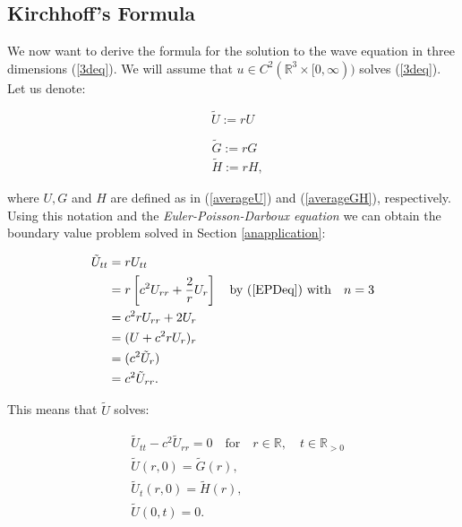 \documentclass[a4paper, 12pt]{article}
\numberwithin{equation}{section}
\begin{document}
\subsection{Kirchhoff's Formula}
We now want to derive the formula for the solution to the wave equation in three dimensions (\ref{3deq}). We will assume that $u \in C^2(\mathbb{R}^3 \times
[0, \infty))$ solves (\ref{3deq}). Let us denote:

\begin{equation} \label{Udash}
    \tilde{U}:=rU
\end{equation}

\begin{equation} \label{GHdash}
    \begin{aligned}
        &\tilde{G}:=rG\\
        &\tilde{H}:=rH,    
    \end{aligned}
\end{equation}

where $U,G$ and $H$ are defined as in (\ref{averageU}) and (\ref{averageGH}), respectively. 
\\

Using this notation and the \emph{Euler-Poisson-Darboux equation} we can
obtain the boundary value problem solved in Section \ref{anapplication}:

\begin{equation*}
    \begin{aligned}
        \tilde{U}_{tt}&=rU_{tt}\\
        &=r\left[c^2U_{rr}+\frac{2}{r}U_r\right] \quad \textrm{by (\ref{EPDeq}) with} \quad n=3\\
        &=c^2rU_{rr}+2U_r\\
        &=(U+c^2rU_r)_r\\
        &=(c^2\tilde{U}_r)\\
        &=c^2\tilde{U}_{rr}.        
    \end{aligned}
\end{equation*}

This means that $\tilde{U}$ solves:

\begin{equation} \label{tilUwave}
    \begin{aligned}
        &\tilde{U}_{tt}-c^2\tilde{U}_{rr}=0 \quad \textrm {for} \quad r \in \mathbb{R}, \quad t \in \mathbb{R}_{>0}\\
        &\tilde{U}(r, 0)=\tilde{G}(r), \\
        &\tilde{U}_t(r, 0)=\tilde{H}(r),\\
        &\tilde{U}(0, t)=0.
    \end{aligned}
\end{equation}
\end{document}

